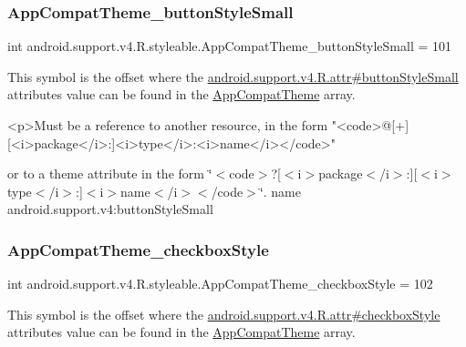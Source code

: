 \subsubsection{\texorpdfstring{App\+Compat\+Theme\+\_\+button\+Style\+Small}{AppCompatTheme\_buttonStyleSmall}}
{\footnotesize\ttfamily int android.\+support.\+v4.\+R.\+styleable.\+App\+Compat\+Theme\+\_\+button\+Style\+Small = 101\hspace{0.3cm}{\ttfamily [static]}}

This symbol is the offset where the \hyperlink{classandroid_1_1support_1_1v4_1_1R_1_1attr_a1d9fea4ceb03e8088fdb83e6d77cc643}{android.\+support.\+v4.\+R.\+attr\#button\+Style\+Small} attribute\textquotesingle{}s value can be found in the \hyperlink{classandroid_1_1support_1_1v4_1_1R_1_1styleable_ac07ebbe62ed977f6dcaadc6397840ace}{App\+Compat\+Theme} array.

\begin{DoxyVerb}      <p>Must be a reference to another resource, in the form "<code>@[+][<i>package</i>:]<i>type</i>:<i>name</i></code>"
\end{DoxyVerb}
 or to a theme attribute in the form \char`\"{}$<$code$>$?\mbox{[}$<$i$>$package$<$/i$>$\+:\mbox{]}\mbox{[}$<$i$>$type$<$/i$>$\+:\mbox{]}$<$i$>$name$<$/i$>$$<$/code$>$\char`\"{}.  name android.\+support.\+v4\+:button\+Style\+Small \mbox{\label{classandroid_1_1support_1_1v4_1_1R_1_1styleable_aa590bb5373f4b9fd718702b7c9454c66}} 
\subsubsection{\texorpdfstring{App\+Compat\+Theme\+\_\+checkbox\+Style}{AppCompatTheme\_checkboxStyle}}
{\footnotesize\ttfamily int android.\+support.\+v4.\+R.\+styleable.\+App\+Compat\+Theme\+\_\+checkbox\+Style = 102\hspace{0.3cm}{\ttfamily [static]}}

This symbol is the offset where the \hyperlink{classandroid_1_1support_1_1v4_1_1R_1_1attr_a04c5a500ffe48ab95d64d07c4206408d}{android.\+support.\+v4.\+R.\+attr\#checkbox\+Style} attribute\textquotesingle{}s value can be found in the \hyperlink{classandroid_1_1support_1_1v4_1_1R_1_1styleable_ac07ebbe62ed977f6dcaadc6397840ace}{App\+Compat\+Theme} array.

